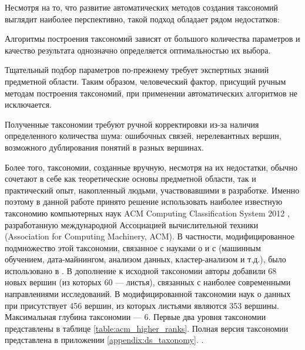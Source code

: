 \documentclass[12pt]{article}
\newenvironment{itemize*}%
{\begin{itemize}%
	\setlength{\itemsep}{0pt}%
	\setlength{\parskip}{0pt}}%
{\end{itemize}}
\begin{document}
Несмотря на то, что развитие автоматических методов создания таксономий выглядит наиболее перспективно, такой подход обладает рядом недостатков:
\begin{itemize*}
	\item Алгоритмы построения таксономий зависят от большого количества параметров и качество результата однозначно определяется оптимальностью их выбора.
	\item Тщательный подбор параметров по-прежнему требует экспертных знаний предметной области. Таким образом, человеческий фактор, присущий ручным методам построения таксономий, при применении автоматических алгоритмов не исключается.
	\item Полученные таксономии требуют ручной корректировки из-за наличия определенного количества шума: ошибочных связей, нерелевантных вершин, возможного дублирования понятий в разных вершинах.
\end{itemize*}
Более того, таксономии, созданные вручную, несмотря на их недостатки, обычно сочетают в себе как теоретические основы предметной области, так и практический опыт, накопленный людьми, участвовавшими в разработке. Именно поэтому в данной работе принято решение использовать наиболее известную таксономию компьютерных наук ACM Computing Classification System 2012 \cite{associationforcomputingmachinery}, разработанную международной Ассоциацией вычислительной техники (Association for Computing Machinery, ACM). В частности, модифицированное подмножество этой таксономии, связанное с науками о и с (машинным обучением, дата-майнингом, анализом данных, кластер-анализом и т.д.), было использовано в \cite{mirkin2018preprint}. В дополнение к исходной таксономии авторы добавили 68 новых вершин (из которых 60 --- листья), связанных с наиболее современными направлениями исследований. В модифицированной таксономии наук о данных при присутствует 456 вершин, из которых листьями являются 353 вершины. Максимальная глубина таксономии --- 6. Первые два уровня таксономии представлены в таблице \ref{table:acm_higher_ranks}. Полная версия таксономии представлена в приложении \ref{appendix:ds_taxonomy}.
.
\end{document}
